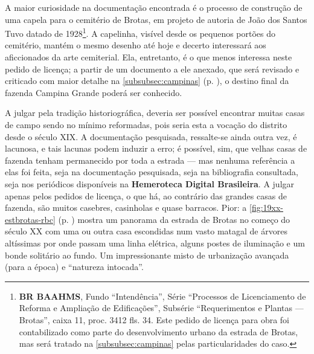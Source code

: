 A maior curiosidade na documentação encontrada é o processo de construção de uma capela para o cemitério de Brotas, em projeto de autoria de João dos Santos Tuvo datado de 1928\footnote{\textbf{BR BAAHMS}, Fundo ``Intendência'', Série ``Processos de Licenciamento de Reforma e Ampliação de Edificações'', Subsérie ``Requerimentos e Plantas --- Brotas'', caixa 11, proc. 3412 fls. 34. Este pedido de licença para obra foi contabilizado como parte do desenvolvimento urbano da estrada de Brotas, mas será tratado na \autoref{subsubsec:campinas} pelas particularidades do caso.}. A capelinha, visível desde os pequenos portões do cemitério, mantém o mesmo desenho até hoje e decerto interessará aos aficcionados da arte cemiterial. Ela, entretanto, é o que menos interessa neste pedido de licença; a partir de um documento a ele anexado, que será revisado e criticado com maior detalhe na \autoref{subsubsec:campinas} (p. \pageref{subsubsec:campinas}), o destino final da fazenda Campina Grande poderá ser conhecido.


A julgar pela tradição historiográfica, deveria ser possível encontrar muitas casas de campo sendo no mínimo reformadas, pois seria esta a vocação do distrito desde o século XIX. A documentação pesquisada, ressalte-se ainda outra vez, é lacunosa, e tais lacunas podem induzir a erro; é possível, sim, que velhas casas de fazenda tenham permanecido por toda a estrada --- mas nenhuma referência a elas foi feita, seja na documentação pesquisada, seja na bibliografia consultada, seja nos periódicos disponíveis na \textbf{Hemeroteca Digital Brasileira}. A julgar apenas pelos pedidos de licença, o que há, ao contrário das grandes casas de fazenda, são muitos casebres, casinholas e quase barracos. Pior: a \autoref{fig:19xx-estbrotas-rbc} (p. \pageref{fig:19xx-estbrotas-rbc}) mostra um panorama da estrada de Brotas no começo do século XX com uma ou outra casa escondidas num vasto matagal de árvores altíssimas por onde passam uma linha elétrica, alguns postes de iluminação e um bonde solitário ao fundo. Um impressionante misto de urbanização avançada (para a época) e ``natureza intocada''. 

